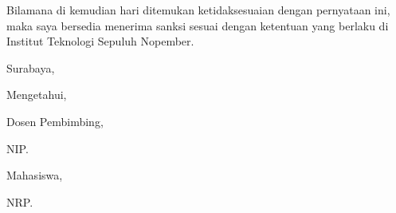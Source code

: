     \vspace{5mm}
    \noindent
    Bilamana di kemudian hari ditemukan ketidaksesuaian dengan pernyataan ini, maka saya bersedia menerima sanksi sesuai dengan ketentuan yang berlaku di Institut Teknologi Sepuluh Nopember.

    \vspace{1cm}
    \begin{flushright}
        Surabaya, ~\@tanggal ~\@bulan ~\@tahun
    \end{flushright}

    \noindent Mengetahui,

    \vspace{1mm}
    \noindent
    \begin{minipage}{.6\textwidth}
        Dosen Pembimbing,

        \vspace{3cm}
        \noindent \underline{\pbb@satu}

        NIP. ~\NIP@pbb@satu
    \end{minipage}
    \begin{minipage}{.35\textwidth}
        Mahasiswa,

        \vspace{3cm}
        \noindent \underline{\@nama}

        NRP. ~\@NRP
    \end{minipage}
\makeatother